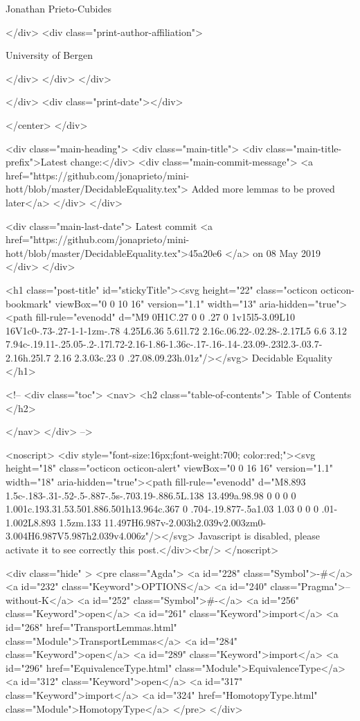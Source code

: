                   Jonathan Prieto-Cubides
                
              </div>
              <div class="print-author-affiliation">
                
                  University of Bergen
                
                </div>
            </div>
          </div>
          
          
        </div>
        <div class="print-date"></div>
        
        
    </center>
  </div>

  
  <div class="main-heading">
    <div class="main-title">
      <div class="main-title-prefix">Latest change:</div>
      <div class="main-commit-message">
            <a href="https://github.com/jonaprieto/mini-hott/blob/master/DecidableEquality.tex">
              Added more lemmas to be proved later</a>
      </div>
    </div>

    <div class="main-last-date">
      Latest commit <a href="https://github.com/jonaprieto/mini-hott/blob/master/DecidableEquality.tex">45a20e6 </a> on  08 May 2019
    </div>
  </div>
  
  <h1 class="post-title" id="stickyTitle"><svg height="22" class="octicon octicon-bookmark" viewBox="0 0 10 16" version="1.1" width="13" aria-hidden="true"><path fill-rule="evenodd" d="M9 0H1C.27 0 0 .27 0 1v15l5-3.09L10 16V1c0-.73-.27-1-1-1zm-.78 4.25L6.36 5.61l.72 2.16c.06.22-.02.28-.2.17L5 6.6 3.12 7.94c-.19.11-.25.05-.2-.17l.72-2.16-1.86-1.36c-.17-.16-.14-.23.09-.23l2.3-.03.7-2.16h.25l.7 2.16 2.3.03c.23 0 .27.08.09.23h.01z"/></svg> Decidable Equality
  </h1>

  <!-- 
  <div class="toc">
    <nav>
    <h2 class="table-of-contents"> Table of Contents </h2>
      

    </nav>
  </div>
   -->

  <noscript>
  <div style="font-size:16px;font-weight:700; color:red;"><svg height="18" class="octicon octicon-alert" viewBox="0 0 16 16" version="1.1" width="18" aria-hidden="true"><path fill-rule="evenodd" d="M8.893 1.5c-.183-.31-.52-.5-.887-.5s-.703.19-.886.5L.138 13.499a.98.98 0 0 0 0 1.001c.193.31.53.501.886.501h13.964c.367 0 .704-.19.877-.5a1.03 1.03 0 0 0 .01-1.002L8.893 1.5zm.133 11.497H6.987v-2.003h2.039v2.003zm0-3.004H6.987V5.987h2.039v4.006z"/></svg> Javascript is disabled, please activate it to see correctly this post.</div><br/>
  </noscript>

  <div class="hide" >
<pre class="Agda">
<a id="228" class="Symbol">{-#</a> <a id="232" class="Keyword">OPTIONS</a> <a id="240" class="Pragma">--without-K</a> <a id="252" class="Symbol">#-}</a>
<a id="256" class="Keyword">open</a> <a id="261" class="Keyword">import</a> <a id="268" href="TransportLemmas.html" class="Module">TransportLemmas</a>
<a id="284" class="Keyword">open</a> <a id="289" class="Keyword">import</a> <a id="296" href="EquivalenceType.html" class="Module">EquivalenceType</a>
<a id="312" class="Keyword">open</a> <a id="317" class="Keyword">import</a> <a id="324" href="HomotopyType.html" class="Module">HomotopyType</a>
</pre>
</div>


